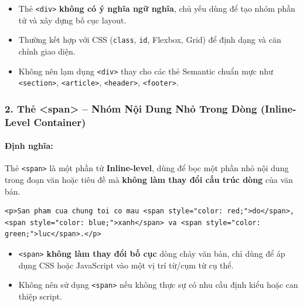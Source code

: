 \documentclass[11pt,oneside]{book}
\newcommand{\codeinline}[1]{\textcolor{accentOrange}{\texttt{#1}}}
\newcommand{\term}[1]{\textbf{\textcolor{primaryBlue}{#1}}}
\begin{document}
\begin{noteBox}
\begin{itemize}[leftmargin=1.5em, itemsep=3pt, parsep=0pt]
    \item Thẻ \codeinline{<div>} \textbf{không có ý nghĩa ngữ nghĩa}, chủ yếu dùng để tạo nhóm phần tử và xây dựng bố cục layout.
    \item Thường kết hợp với CSS (\codeinline{class}, \codeinline{id}, Flexbox, Grid) để định dạng và căn chỉnh giao diện.
    \item Không nên lạm dụng \codeinline{<div>} thay cho các thẻ Semantic chuẩn mực như \codeinline{<section>}, \codeinline{<article>}, \codeinline{<header>}, \codeinline{<footer>}.
\end{itemize}
\end{noteBox}

\subsubsection{2. Thẻ <span> -- Nhóm Nội Dung Nhỏ Trong Dòng (Inline-Level Container)}

\paragraph{Định nghĩa:}
Thẻ \codeinline{<span>} là một phần tử \term{Inline-level}, dùng để bọc một phần nhỏ nội dung trong đoạn văn hoặc tiêu đề mà \textbf{không làm thay đổi cấu trúc dòng} của văn bản.

\begin{codeWindow}
\begin{lstlisting}[language=HTML5]
<p>San pham cua chung toi co mau <span style="color: red;">do</span>, <span style="color: blue;">xanh</span> va <span style="color: green;">luc</span>.</p>
\end{lstlisting}
\end{codeWindow}

\begin{noteBox}
\begin{itemize}[leftmargin=1.5em, itemsep=3pt, parsep=0pt]
    \item \codeinline{<span>} \textbf{không làm thay đổi bố cục} dòng chảy văn bản, chỉ dùng để áp dụng CSS hoặc JavaScript vào một vị trí từ/cụm từ cụ thể.
    \item Không nên sử dụng \codeinline{<span>} nếu không thực sự có nhu cầu định kiểu hoặc can thiệp script.
\end{itemize}
\end{noteBox}
\end{document}
